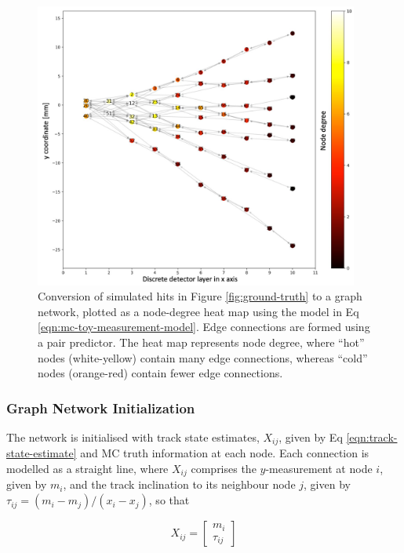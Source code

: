 \begin{figure}[htbp]
    \centering
    \includegraphics[width=0.95\textwidth]{images/5-gnn-algorithm/heatmap-network.png}
    \caption{Conversion of simulated hits in Figure \ref{fig:ground-truth} to a graph network, plotted as a node-degree heat map using the model in Eq \eqref{eqn:mc-toy-measurement-model}. Edge connections are formed using a pair predictor. The heat map represents node degree, where ``hot'' nodes (white-yellow) contain many edge connections, whereas ``cold'' nodes (orange-red) contain fewer edge connections.}
    \label{fig:heat-map}%
\end{figure}


\subsubsection{Graph Network Initialization}

The network is initialised with track state estimates, $X_{ij}$, given by Eq \eqref{eqn:track-state-estimate} and MC truth information at each node. Each connection is modelled as a straight line, where $X_{ij}$ comprises the $y$-measurement at node $i$, given by $m_i$, and the track inclination to its neighbour node $j$, given by $\tau_{ij} = (m_i - m_j) / (x_i - x_j)$, so that

\begin{equation}
X_{ij} = \begin{bmatrix} m_i \\ \tau_{ij} \end{bmatrix}
\label{eqn:track-state-estimate}
\end{equation}


